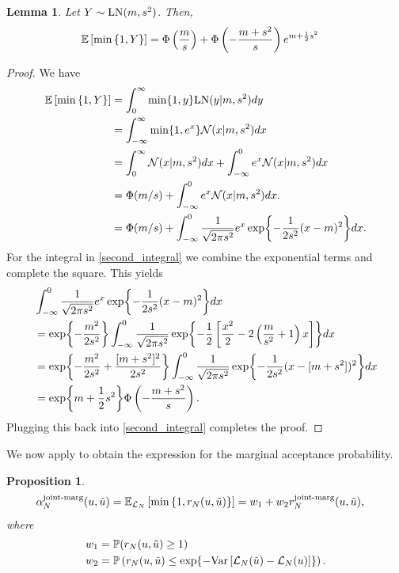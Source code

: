 \documentclass[12pt]{article}
\newtheorem{prop}{Proposition}
\newtheorem{lemma}{Lemma}
\begin{document}
\begin{lemma} \label{lemma:exp_max_one_LN}
Let $Y \sim \LN(m, s^2)$. Then, 
\begin{align}
\E\left[\min\left\{1, Y \right\} \right] &= \GaussianCDF\left(\frac{m}{s} \right) + \GaussianCDF\left(-\frac{m + s^2}{s} \right) e^{m + \frac{1}{2}s^2}
\end{align}
\end{lemma}

\begin{proof}
We have 
\begin{align}
\E\left[\min\left\{1, Y \right\} \right]
&= \int_{0}^{\infty} \min\{1, y\} \LN(y | m, s^2) dy \nonumber \\
&= \int_{-\infty}^{\infty} \min\{1, e^x\} \Gaussian(x | m, s^2) dx \nonumber \\
&= \int_{0}^{\infty} \Gaussian(x | m, s^2) dx +  \int_{-\infty}^{0} e^x \Gaussian(x | m, s^2) dx \nonumber \\
&= \GaussianCDF(m/s) + \int_{-\infty}^{0} e^x \Gaussian(x | m, s^2) dx. \nonumber \\
&= \GaussianCDF(m/s) + \int_{-\infty}^{0} \frac{1}{\sqrt{2\pi s^2}} e^x \Exp{-\frac{1}{2s^2} (x - m)^2} dx.  
\label{second_integral} 
\end{align}
For the integral in \ref{second_integral} we combine the exponential terms and complete the square. 
This yields 
\begin{align*}
&\int_{-\infty}^{0} \frac{1}{\sqrt{2\pi s^2}} e^x \Exp{-\frac{1}{2s^2} (x - m)^2} dx \\
&= \Exp{-\frac{m^2}{2s^2}} \int_{-\infty}^{0} \frac{1}{\sqrt{2\pi s^2}} \Exp{-\frac{1}{2} \left[\frac{x^2}{2} - 2\left(\frac{m}{s^2} + 1\right)x  \right]} dx \\
&= \Exp{-\frac{m^2}{2s^2} + \frac{[m + s^2]^2}{2s^2}} \int_{-\infty}^{0} \frac{1}{\sqrt{2\pi s^2}} \Exp{-\frac{1}{2s^2}(x - [m+s^2])^2} dx \\
&= \Exp{m + \frac{1}{2}s^2} \GaussianCDF\left(-\frac{m+s^2}{s}\right).
\end{align*}
Plugging this back into \ref{second_integral} completes the proof. 
\end{proof}

We now apply  to obtain the expression for the marginal acceptance probability. 
\begin{prop} \label{prop:joint-marg-accept-prob}
\begin{align*}
\llikEmJointMarg[\Ndesign]{\accProbMH}(\Par, \propPar) 
&= \E_{\llikEm[\Ndesign]} \left[\min\left\{1, \Em[\Ndesign]{\accProbRatio}(\Par, \propPar)\right\} \right] 
= w_1 + w_2 \llikEmJointMarg[\Ndesign]{\accProbRatio}(\Par, \propPar), 
\end{align*}
where 
\begin{align*}
w_1 &= \Prob(\Em[\Ndesign]{\accProbRatio}(\Par, \propPar) \geq 1) \\
w_2 &= \Prob\left(\Em[\Ndesign]{\accProbRatio}(\Par, \propPar) \leq \Exp{-\Var\left[\llikEm[\Ndesign](\propPar) - \llikEm[\Ndesign](\Par) \right]}\right).
\end{align*}
\end{prop}
\end{document}
